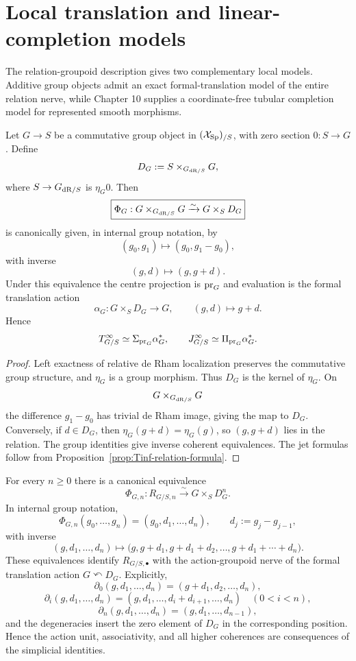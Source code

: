 \section{Local translation and linear-completion models}
\label{sec:jet-local-linear-models}

The relation-groupoid description gives two complementary local models.  Additive group objects admit an exact formal-translation model of the entire relation nerve, while Chapter 10 supplies a coordinate-free tubular completion model for represented smooth morphisms.

\begin{proposition}
\label{prop:jet-group-translation}
Let $G\to S$ be a commutative group object in $(\mathcal{X}_{\mathrm{Sp}})_{/S}$, with zero section $0:S\to G$.  Define
\[
    D_G:=S\times_{G_{\mathrm{dR}/S}}G,
\]
where $S\to G_{\mathrm{dR}/S}$ is $\eta_G0$.  Then
\[
\boxed{
    \Phi_G:
    G\times_{G_{\mathrm{dR}/S}}G
    \xrightarrow{\sim}
    G\times_SD_G
}
\]
is canonically given, in internal group notation, by
\[
    (g_0,g_1)\longmapsto(g_0,g_1-g_0),
\]
with inverse
\[
    (g,d)\longmapsto(g,g+d).
\]
Under this equivalence the centre projection is $\operatorname{pr}_G$ and evaluation is the formal translation action
\[
    \alpha_G:G\times_SD_G\longrightarrow G,
    \qquad
    (g,d)\longmapsto g+d.
\]
Hence
\[
    T^{\infty}_{G/S}\simeq\Sigma_{\operatorname{pr}_G}\alpha_G^*,
    \qquad
    J^{\infty}_{G/S}\simeq\Pi_{\operatorname{pr}_G}\alpha_G^*.
\]
\end{proposition}

\begin{proof}
Left exactness of relative de Rham localization preserves the commutative group structure, and $\eta_G$ is a group morphism.  Thus $D_G$ is the kernel of $\eta_G$.  On
\[
    G\times_{G_{\mathrm{dR}/S}}G
\]
the difference $g_1-g_0$ has trivial de Rham image, giving the map to $D_G$.  Conversely, if $d\in D_G$, then $\eta_G(g+d)=\eta_G(g)$, so $(g,g+d)$ lies in the relation.  The group identities give inverse coherent equivalences.  The jet formulas follow from Proposition~\ref{prop:Tinf-relation-formula}.
\end{proof}

\begin{theorem}
\label{thm:formal-translation-nerve}
For every $n\geq0$ there is a canonical equivalence
\[
\boxed{
    \Phi_{G,n}:R_{G/S,n}\xrightarrow{\sim}G\times_SD_G^n.
}
\]
In internal group notation,
\[
    \Phi_{G,n}(g_0,\ldots,g_n)
    =
    (g_0,d_1,\ldots,d_n),
    \qquad
    d_j:=g_j-g_{j-1},
\]
with inverse
\[
    (g,d_1,\ldots,d_n)
    \longmapsto
    \bigl(g,g+d_1,g+d_1+d_2,\ldots,g+d_1+\cdots+d_n\bigr).
\]
These equivalences identify $R_{G/S,\bullet}$ with the action-groupoid nerve of the formal translation action $G\curvearrowleft D_G$.  Explicitly,
\[
\partial_0(g,d_1,\ldots,d_n)
=
(g+d_1,d_2,\ldots,d_n),
\]
\[
\partial_i(g,d_1,\ldots,d_n)
=
(g,d_1,\ldots,d_i+d_{i+1},\ldots,d_n)
\quad(0<i<n),
\]
\[
\partial_n(g,d_1,\ldots,d_n)
=
(g,d_1,\ldots,d_{n-1}),
\]
and the degeneracies insert the zero element of $D_G$ in the corresponding position.  Hence the action unit, associativity, and all higher coherences are consequences of the simplicial identities.
\end{theorem}

